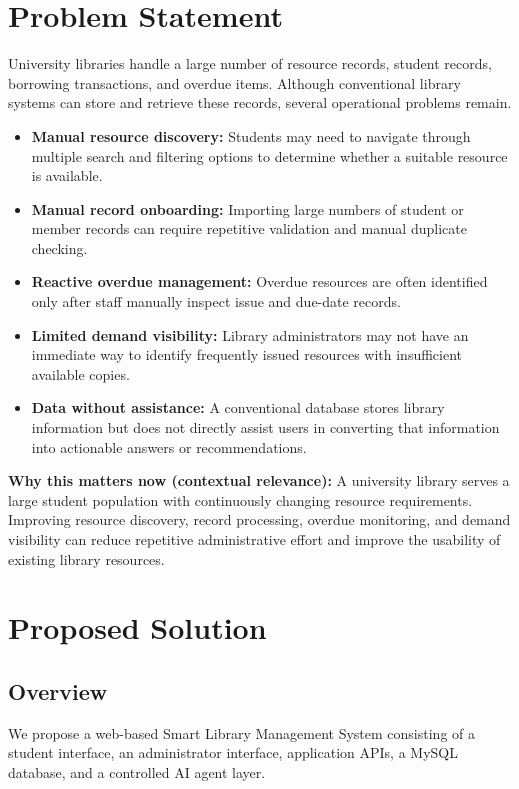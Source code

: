 \documentclass[11pt]{article}
\begin{document}
\section{Problem Statement}
University libraries handle a large number of resource records, student records, borrowing transactions, and overdue items. Although conventional library systems can store and retrieve these records, several operational problems remain.
\begin{itemize}
    \item \textbf{Manual resource discovery:} Students may need to navigate through multiple search and filtering options to determine whether a suitable resource is available.
    \item \textbf{Manual record onboarding:} Importing large numbers of student or member records can require repetitive validation and manual duplicate checking.
    \item \textbf{Reactive overdue management:} Overdue resources are often identified only after staff manually inspect issue and due-date records.
    \item \textbf{Limited demand visibility:} Library administrators may not have an immediate way to identify frequently issued resources with insufficient available copies.
    \item \textbf{Data without assistance:} A conventional database stores library information but does not directly assist users in converting that information into actionable answers or recommendations.
\end{itemize}
\textbf{Why this matters now (contextual relevance):} A university library serves a large student population with continuously changing resource requirements. Improving resource discovery, record processing, overdue monitoring, and demand visibility can reduce repetitive administrative effort and improve the usability of existing library resources.

\section{Proposed Solution}
\subsection{Overview}
We propose a web-based Smart Library Management System consisting of a student interface, an administrator interface, application APIs, a MySQL database, and a controlled AI agent layer.
\end{document}
